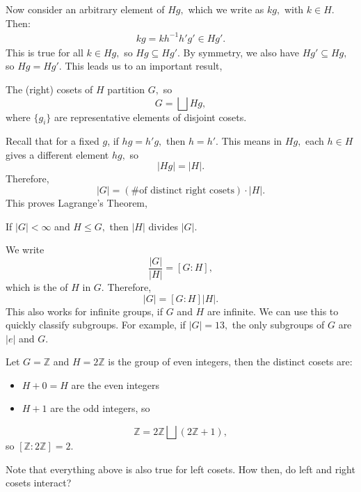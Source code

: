 \documentclass{article}
\numberwithin{equation}{section}
\begin{document}
Now consider an arbitrary element of $Hg,$ which we write as $kg,$ with $k\in H.$ Then:
\begin{align*}
    kg = kh^{-1}h'g' \in Hg'.
\end{align*}
This is true for all $k\in Hg,$ so $Hg \subseteq Hg'.$ By symmetry, we also have $Hg' \subseteq Hg,$ so $Hg=Hg'.$ This leads us to an important result,
\begin{proposition}
    The (right) cosets of $H$ partition $G,$ so 
    \begin{equation*}
        G = \bigsqcup Hg,
    \end{equation*}
    where $\{g_i\}$ are representative elements of disjoint cosets.
\end{proposition}
Recall that for a fixed $g$, if $hg=h'g,$ then $h=h'.$ This means in $Hg,$ each $h\in H$ gives a different element $hg,$ so 
\begin{equation*}
    |Hg| = |H|.
\end{equation*}
Therefore, \begin{equation*}
    |G| = (\text{\# of distinct right cosets}) \cdot |H|.
\end{equation*}
This proves Lagrange's Theorem,
\begin{theorem}
    If $|G|<\infty$ and $H \le G,$ then $|H|$ divides $|G|.$
\end{theorem}
We write 
\begin{equation*}
    \frac{|G|}{|H|} = [G:H],
\end{equation*}
which is the  of $H$ in $G.$ Therefore, 
\begin{equation*}
    |G| = [G:H] |H|.
\end{equation*}
This also works for infinite groups, if $G$ and $H$ are infinite. We can use this to quickly classify subgroups. For example, if $|G|=13,$ the only subgroups of $G$ are $|e|$ and $G.$
\begin{example}
    Let $G=\mathbb{Z}$ and $H=2\mathbb{Z}$ is the group of even integers, then the distinct cosets are:
    \begin{itemize}
        \item $H+0=H$ are the even integers
        \item $H+1$ are the odd integers, so 
    \end{itemize}
    \begin{equation*}
        \mathbb{Z} = 2\mathbb{Z} \bigsqcup (2\mathbb{Z}+1),
    \end{equation*}
    so $[\mathbb{Z}:2\mathbb{Z}]=2.$
\end{example}
Note that everything above is also true for left cosets. How then, do left and right cosets interact?
\end{document}
